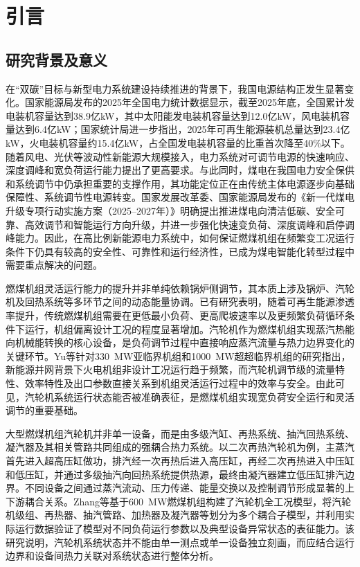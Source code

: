 \section{引言}
\label{sec:introduction}

\subsection{研究背景及意义}

在“双碳”目标与新型电力系统建设持续推进的背景下，我国电源结构正发生显著变化。国家能源局发布的2025年全国电力统计数据显示，截至2025年底，全国累计发电装机容量达到38.9亿kW，其中太阳能发电装机容量达到12.0亿kW，风电装机容量达到6.4亿kW\cite{NEA2026PowerStatistics}；国家统计局进一步指出，2025年可再生能源装机总量达到23.4亿kW，火电装机容量约15.4亿kW，占全国发电装机容量的比重首次降至40\%以下\cite{NBS2026EnergyTransition}。随着风电、光伏等波动性新能源大规模接入，电力系统对可调节电源的快速响应、深度调峰和宽负荷运行能力提出了更高要求。与此同时，煤电在我国电力安全保供和系统调节中仍承担重要的支撑作用，其功能定位正在由传统主体电源逐步向基础保障性、系统调节性电源转变。国家发展改革委、国家能源局发布的《新一代煤电升级专项行动实施方案（2025--2027年）》明确提出推进煤电向清洁低碳、安全可靠、高效调节和智能运行方向升级，并进一步强化快速变负荷、深度调峰和启停调峰能力\cite{NDRC2025CoalPowerUpgrade}。因此，在高比例新能源电力系统中，如何保证燃煤机组在频繁变工况运行条件下仍具有较高的安全性、可靠性和运行经济性，已成为煤电智能化转型过程中需要重点解决的问题。

燃煤机组灵活运行能力的提升并非单纯依赖锅炉侧调节，其本质上涉及锅炉、汽轮机及回热系统等多环节之间的动态能量协调。已有研究表明，随着可再生能源渗透率提升，传统燃煤机组需要在更低最小负荷、更高爬坡速率以及更频繁负荷循环条件下运行，机组偏离设计工况的程度显著增加\cite{GonzalezSalazar2018Flexibility}。汽轮机作为燃煤机组实现蒸汽热能向机械能转换的核心设备，是负荷调节过程中直接响应蒸汽流量与热力边界变化的关键环节。Yu等针对330~MW亚临界机组和1000~MW超超临界机组的研究指出，新能源并网背景下火电机组非设计工况运行趋于频繁，而汽轮机调节级的流量特性、效率特性及出口参数直接关系到机组灵活运行过程中的效率与安全\cite{Yu2020HybridDigitalTwin}。由此可见，汽轮机系统运行状态能否被准确表征，是燃煤机组实现宽负荷安全运行和灵活调节的重要基础。

大型燃煤机组汽轮机并非单一设备，而是由多级汽缸、再热系统、抽汽回热系统、凝汽器及其相关管路共同组成的强耦合热力系统。以二次再热汽轮机为例，主蒸汽首先进入超高压缸做功，排汽经一次再热后进入高压缸，再经二次再热进入中压缸和低压缸，并通过多级抽汽向回热系统提供热源，最终由凝汽器建立低压缸排汽边界。不同设备之间通过蒸汽流动、压力传递、能量交换以及控制调节形成显著的上下游耦合关系。Zhang等基于600~MW燃煤机组构建了汽轮机全工况模型，将汽轮机级组、再热器、抽汽管路、加热器及凝汽器等划分为多个耦合子模型，并利用实际运行数据验证了模型对不同负荷运行参数以及典型设备异常状态的表征能力\cite{Zhang2018AllCondition}。该研究说明，汽轮机系统状态并不能由单一测点或单一设备独立刻画，而应结合运行边界和设备间热力关联对系统状态进行整体分析。

